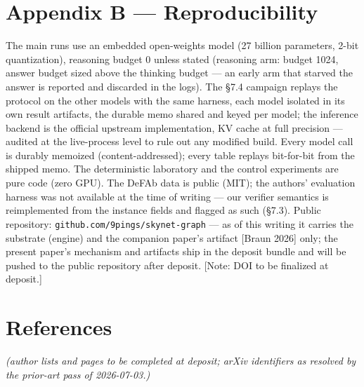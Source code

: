 \documentclass[11pt]{article}
\begin{document}
\section*{Appendix B — Reproducibility}

The main runs use an embedded open-weights model (27 billion parameters, 2-bit quantization), reasoning budget 0 unless stated (reasoning arm: budget 1024, answer budget sized above the thinking budget — an early arm that starved the answer is reported and discarded in the logs). The §7.4 campaign replays the protocol on the other models with the same harness, each model isolated in its own result artifacts, the durable memo shared and keyed per model; the inference backend is the official upstream implementation, KV cache at full precision — audited at the live-process level to rule out any modified build. Every model call is durably memoized (content-addressed); every table replays bit-for-bit from the shipped memo. The deterministic laboratory and the control experiments are pure code (zero GPU). The DeFAb data is public (MIT); the authors' evaluation harness was not available at the time of writing — our verifier semantics is reimplemented from the instance fields and flagged as such (§7.3). Public repository: \texttt{github.com/\allowbreak{}9pings/\allowbreak{}skynet-graph} — as of this writing it carries the substrate (engine) and the companion paper's artifact [Braun 2026] only; the present paper's mechanism and artifacts ship in the deposit bundle and will be pushed to the public repository after deposit. [Note: DOI to be finalized at deposit.]

\section*{References}

\emph{(author lists and pages to be completed at deposit; arXiv identifiers as resolved by the prior-art pass of 2026-07-03.)}
\end{document}
